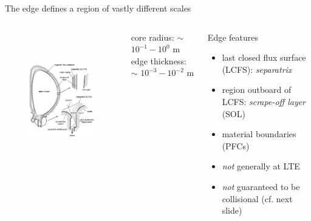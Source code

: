 \documentclass{beamer}
\begin{document}
\begin{frame}{The edge defines a region of vastly different scales}
\begin{columns}
    \begin{figure}
    \includegraphics[height=6cm, keepaspectratio]{graphics/edge_anatomy}
    \end{figure}
core radius: $\sim$ $10^{-1} - 10^0$ m \\
edge thickness: $\sim$ $10^{-3} - 10^{-2}$ m
    \begin{block}{Edge features}
      \begin{itemize}
        \item last closed flux surface (LCFS): \emph{separatrix}
        \item region outboard of LCFS: \emph{scrape-off layer} (SOL)
        \item material boundaries (PFCs)
        \item \emph{not} generally at LTE
        \item \emph{not} guaranteed to be collisional (cf. next slide)
      \end{itemize}
    \end{block}
  \end{columns}


\end{frame}

\end{document}
